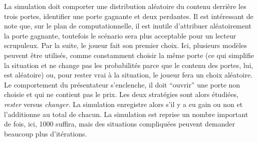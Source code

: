 \documentclass[
]{book}
\begin{document}
La simulation doit comporter une distribution aléatoire du contenu derrière les trois portes, identifier une porte gagnante et deux perdantes. Il est intéressant de note que, sur le plan de computationnelle, il est inutile d'attribuer aléatoirement la porte gagnante, toutefois le scénario sera plus acceptable pour un lecteur scrupuleux. Par la suite, le joueur fait son premier choix. Ici, plusieurs modèles peuvent être utilisés, comme constamment choisir la même porte (ce qui simplifie la situation et ne change pas les probabilités parce que le contenu des portes, lui, est aléatoire) ou, pour rester vrai à la situation, le joueur fera un choix aléatoire. Le comportement du présentateur s'enclenche, il doit ``ouvrir'' une porte non choisie et qui ne contient pas le prix. Les deux stratégies sont alors étudiées, \emph{rester} versus \emph{changer}. La simulation enregistre alors s'il y a eu gain ou non et l'additionne au total de chacun. La simulation est reprise un nombre important de fois, ici, 1000 suffira, mais des situations compliquées peuvent demander beaucoup plus d'itérations.
\end{document}
